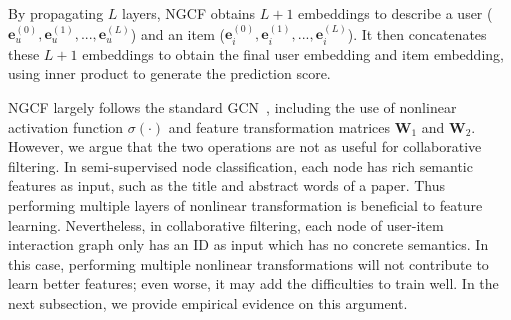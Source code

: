By propagating $L$ layers, NGCF obtains
$L+1$ embeddings to describe a user ($\textbf{e}_u^{(0)}, \textbf{e}_u^{(1)}, ..., \textbf{e}_u^{(L)}$) and an item ($\textbf{e}_i^{(0)}, \textbf{e}_i^{(1)}, ..., \textbf{e}_i^{(L)}$). It then concatenates these $L+1$ embeddings to obtain the final user embedding and item embedding, using inner product to generate the prediction score. 

NGCF largely follows the standard GCN~\cite{GCN}, including the use of nonlinear activation function $\sigma(\cdot)$ and feature transformation matrices $\textbf{W}_1$ and $\textbf{W}_2$. However, we argue that the two operations are not as useful for collaborative filtering. In  semi-supervised node classification, each node has rich semantic features as input, such as the title and abstract words of a paper. Thus performing multiple layers of nonlinear transformation is beneficial to feature learning. Nevertheless, in collaborative filtering, each node of user-item interaction graph only has an ID as input which has no concrete semantics. In this case, performing multiple nonlinear transformations will not contribute to learn better features; even worse, it may add the difficulties to train well. In the next subsection, we provide empirical evidence on this argument. 

